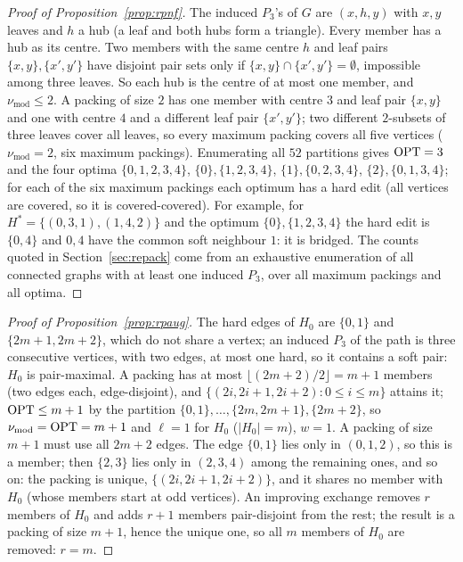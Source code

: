 \begin{proof}[Proof of Proposition~\ref{prop:rpnf}]
The induced $P_3$'s of $G$ are $(x,h,y)$ with $x,y$ leaves and $h$ a hub (a leaf and both hubs form a triangle). Every member has a hub as its centre. Two members with the same centre $h$ and leaf pairs $\{x,y\},\{x',y'\}$ have disjoint pair sets only if $\{x,y\}\cap\{x',y'\}=\emptyset$, impossible among three leaves. So each hub is the centre of at most one member, and $\nu_{\mathrm{mod}}\le2$. A packing of size $2$ has one member with centre $3$ and leaf pair $\{x,y\}$ and one with centre $4$ and a different leaf pair $\{x',y'\}$; two different $2$-subsets of three leaves cover all leaves, so every maximum packing covers all five vertices ($\nu_{\mathrm{mod}}=2$, six maximum packings). Enumerating all $52$ partitions gives $\mathrm{OPT}=3$ and the four optima $\{0,1,2,3,4\}$, $\{0\},\{1,2,3,4\}$, $\{1\},\{0,2,3,4\}$, $\{2\},\{0,1,3,4\}$; for each of the six maximum packings each optimum has a hard edit (all vertices are covered, so it is covered-covered). For example, for $H^*=\{(0,3,1),(1,4,2)\}$ and the optimum $\{0\},\{1,2,3,4\}$ the hard edit is $\{0,4\}$ and $0,4$ have the common soft neighbour $1$: it is bridged. The counts quoted in Section~\ref{sec:repack} come from an exhaustive enumeration of all connected graphs with at least one induced $P_3$, over all maximum packings and all optima.
\end{proof}

\begin{proof}[Proof of Proposition~\ref{prop:rpaug}]
The hard edges of $H_0$ are $\{0,1\}$ and $\{2m+1,2m+2\}$, which do not share a vertex; an induced $P_3$ of the path is three consecutive vertices, with two edges, at most one hard, so it contains a soft pair: $H_0$ is pair-maximal. A packing has at most $\lfloor(2m+2)/2\rfloor=m+1$ members (two edges each, edge-disjoint), and $\{(2i,2i+1,2i+2):0\le i\le m\}$ attains it; $\mathrm{OPT}\le m+1$ by the partition $\{0,1\},\dots,\{2m,2m+1\},\{2m+2\}$, so $\nu_{\mathrm{mod}}=\mathrm{OPT}=m+1$ and $\ell=1$ for $H_0$ ($|H_0|=m$), $w=1$. A packing of size $m+1$ must use all $2m+2$ edges. The edge $\{0,1\}$ lies only in $(0,1,2)$, so this is a member; then $\{2,3\}$ lies only in $(2,3,4)$ among the remaining ones, and so on: the packing is unique, $\{(2i,2i+1,2i+2)\}$, and it shares no member with $H_0$ (whose members start at odd vertices). An improving exchange removes $r$ members of $H_0$ and adds $r+1$ members pair-disjoint from the rest; the result is a packing of size $m+1$, hence the unique one, so all $m$ members of $H_0$ are removed: $r=m$.
\end{proof}

